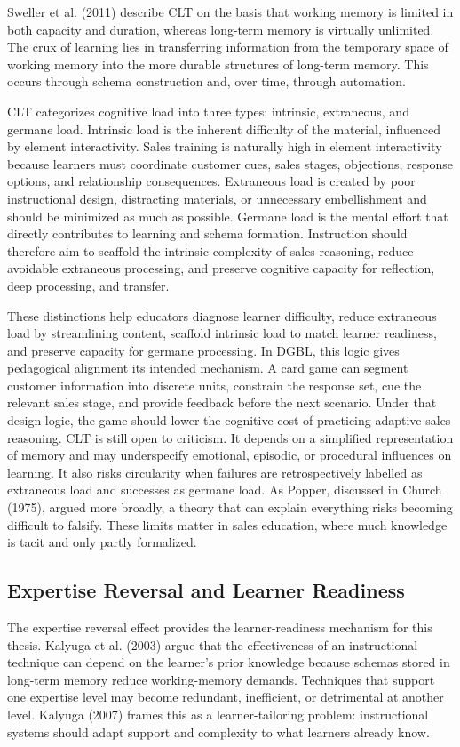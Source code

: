 \documentclass[12pt]{report}
\begin{document}
Sweller et al. (2011) describe CLT on the basis that working memory is limited in both capacity and duration, whereas long-term memory is virtually unlimited. The crux of learning lies in transferring information from the temporary space of working memory into the more durable structures of long-term memory. This occurs through schema construction and, over time, through automation.

CLT categorizes cognitive load into three types: intrinsic, extraneous, and germane load. Intrinsic load is the inherent difficulty of the material, influenced by element interactivity. Sales training is naturally high in element interactivity because learners must coordinate customer cues, sales stages, objections, response options, and relationship consequences. Extraneous load is created by poor instructional design, distracting materials, or unnecessary embellishment and should be minimized as much as possible. Germane load is the mental effort that directly contributes to learning and schema formation. Instruction should therefore aim to scaffold the intrinsic complexity of sales reasoning, reduce avoidable extraneous processing, and preserve cognitive capacity for reflection, deep processing, and transfer.

These distinctions help educators diagnose learner difficulty, reduce extraneous load by streamlining content, scaffold intrinsic load to match learner readiness, and preserve capacity for germane processing. In DGBL, this logic gives pedagogical alignment its intended mechanism. A card game can segment customer information into discrete units, constrain the response set, cue the relevant sales stage, and provide feedback before the next scenario. Under that design logic, the game should lower the cognitive cost of practicing adaptive sales reasoning. CLT is still open to criticism. It depends on a simplified representation of memory and may underspecify emotional, episodic, or procedural influences on learning. It also risks circularity when failures are retrospectively labelled as extraneous load and successes as germane load. As Popper, discussed in Church (1975), argued more broadly, a theory that can explain everything risks becoming difficult to falsify. These limits matter in sales education, where much knowledge is tacit and only partly formalized.

\subsection{Expertise Reversal and Learner Readiness}
The expertise reversal effect provides the learner-readiness mechanism for this thesis. Kalyuga et al. (2003) argue that the effectiveness of an instructional technique can depend on the learner's prior knowledge because schemas stored in long-term memory reduce working-memory demands. Techniques that support one expertise level may become redundant, inefficient, or detrimental at another level. Kalyuga (2007) frames this as a learner-tailoring problem: instructional systems should adapt support and complexity to what learners already know.
\end{document}
